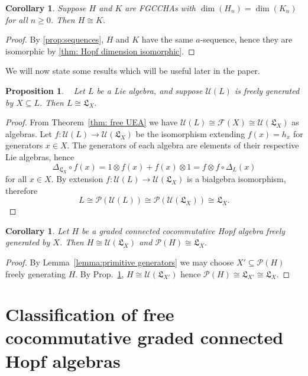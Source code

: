 \documentclass[11pt]{amsart}
\newtheorem{proposition}[theorem]{Proposition}
\newtheorem{corollary}[theorem]{Corollary}
\theoremstyle{definition}
\numberwithin{equation}{section}
\begin{document}
\begin{corollary}
    Suppose $H$ and $K$ are \textsf{FGCCHA}s with $\dim(H_n) = \dim(K_n)$ for all $n \geq 0$. Then $H \cong K$.
\end{corollary}

\begin{proof}
    By \ref{prop:sequences}, $H$ and $K$ have the same $a$-sequence, hence they are isomorphic by \ref{thm: Hopf dimension isomorphic}.
\end{proof}

We will now state some results which will be useful later in the paper.

\begin{proposition}~\cite[Prop. 2.4]{F23}
\label{prop:free primitives}
    Let $L$ be a Lie algebra, and suppose $\mathcal{U}(L)$ is freely generated by $X\subseteq L$. Then $L\cong \mathfrak{L}_X$.
\end{proposition}

\begin{proof}
   From Theorem~\ref{thm: free UEA} we have $\mathcal{U}(L) \cong \mathcal{F}(X) \cong \mathcal{U}(\mathfrak{L}_X)$ as algebras. Let $f:\mathcal{U}(L) \to \mathcal{U}(\mathfrak{L}_X)$ be the isomorphism extending $f(x)=h_x$ for generators $x \in X$. The generators of each algebra are elements of their respective Lie algebras, hence 
    \[
    \Delta_{\mathfrak{L}_X} \circ f(x)=1 \otimes f(x) + f(x) \otimes 1 = f \otimes f \circ \Delta_L(x) 
    \]
    for all $x \in X$. By extension $f:\mathcal{U}(L) \to \mathcal{U}(\mathfrak{L}_X)$ is a bialgebra isomorphism, therefore
    \[
    L \cong \mathcal{P}(\mathcal{U}(L)) \cong \mathcal{P}(\mathcal{U}(\mathfrak{L}_X)) \cong \mathfrak{L}_X.
    \]
\end{proof}

\begin{corollary}
    Let $H$ be a graded connected cocommutative Hopf algebra freely generated by $X$. Then $H \cong \mathcal{U}(\mathfrak{L}_X)$ and $\mathcal{P}(H)\cong \mathfrak{L}_X.$
\label{cor: free hopf primitives}
\end{corollary}
\begin{proof}
    By Lemma~\ref{lemma:primitive generators} we may choose $X'\subseteq \mathcal{P}(H)$ freely generating $H$. By Prop.~\ref{prop:free primitives}, $H\cong \mathcal{U}(\mathfrak{L}_{X'})$ hence $\mathcal{P}(H)\cong \mathfrak{L}_{X'}\cong \mathfrak{L}_X.$
\end{proof}

\section{Classification of free cocommutative graded connected Hopf algebras} 
\end{document}
